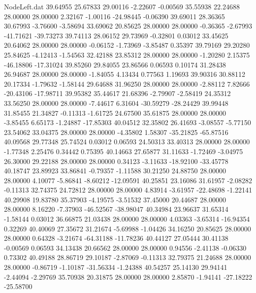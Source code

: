 \begin{filecontents}{NodeLeft.dat}
  39.64955   25.67833   29.00116    -2.22607   -0.00569   35.55938   22.24688   28.00000   28.00000    2.32167   -1.00116  -24.98445   -0.06390
  39.69011   28.36365   30.67993    -3.76600   -3.58694   33.69062   20.85625   28.00000   28.00000   -0.36365   -2.67993  -41.71621  -39.73273
  39.74113   28.06152   29.73969    -0.32801    0.03012   33.45625   20.64062   28.00000   28.00000   -0.06152   -1.73969   -3.85487    0.35397
  39.79169   29.20280   25.84625    -4.12413   -1.54563   32.42188   23.85312   28.00000   28.00000   -1.20280    2.15375  -46.18806  -17.31024
  39.85260   29.84055   23.86566     0.06593    0.10174   31.28438   26.94687   28.00000   28.00000   -1.84055    4.13434    0.77563    1.19693
  39.90316   30.88112   20.17334    -1.79632   -1.58144   29.64688   31.96250   28.00000   28.00000   -2.88112    7.82666  -20.43106  -17.98711
  39.95382   35.44617   21.68396    -2.79907   -2.58419   24.35312   33.56250   28.00000   28.00000   -7.44617    6.31604  -30.59279  -28.24429
  39.99448   31.85455   21.34827    -0.11313   -1.61725   24.67500   35.61875   28.00000   28.00000   -3.85455    6.65173   -1.24887  -17.85303
  40.04512   32.35802   26.41693    -3.08557   -5.77150   23.54062   33.04375   28.00000   28.00000   -4.35802    1.58307  -35.21825  -65.87516
  40.09568   29.77348   25.74524     0.03012    0.06593   24.50313   33.40313   28.00000   28.00000   -1.77348    2.25476    0.34442    0.75395
  40.14663   27.65877   31.11633    -1.72469   -3.04975   26.30000   29.22188   28.00000   28.00000    0.34123   -3.11633  -18.92100  -33.45778
  40.18747   23.89923   33.86841    -0.79357   -1.11588   30.21250   24.88750   28.00000   28.00000    4.10077   -5.86841   -8.60212  -12.09591
  40.25851   23.16086   31.61957    -2.08282   -0.11313   32.74375   24.72812   28.00000   28.00000    4.83914   -3.61957  -22.48698   -1.22141
  40.29908   19.83780   35.37903    -4.19575   -3.51532   37.45000   20.44687   28.00000   28.00000    8.16220   -7.37903  -46.52567  -38.98047
  40.34984   23.96637   31.65314    -1.58144    0.03012   36.66875   21.03438   28.00000   28.00000    4.03363   -3.65314  -16.94354    0.32269
  40.40069   27.35672   31.21674    -5.69988   -1.04426   34.16250   20.85625   28.00000   28.00000    0.64328   -3.21674  -64.31188  -11.78236
  40.44127   27.05444   30.41138    -0.00569    0.06593   34.13438   20.66562   28.00000   28.00000    0.94556   -2.41138   -0.06330    0.73302
  40.49188   28.86719   29.10187    -2.87069   -0.11313   32.79375   21.24688   28.00000   28.00000   -0.86719   -1.10187  -31.56334   -1.24388
  40.54257   25.14130   29.94141    -2.44094   -2.29769   35.70938   20.31875   28.00000   28.00000    2.85870   -1.94141  -27.18222  -25.58700

\end{filecontents}
